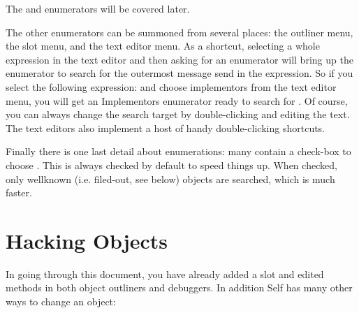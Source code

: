 \documentclass[letterpaper,10pt,english]{sphinxmanual}
\begin{document}
The  and  enumerators will be covered later.

The other enumerators can be summoned from several places: the outliner menu, the slot menu,
and the text editor menu. As a shortcut, selecting a whole expression in the text editor and then asking
for an enumerator will bring up the enumerator to search for the outermost message send in the
expression. So if you select the following expression:   
\sphinxcode{{[}snort{]}}  \sphinxcode{{[}sludge{]}} and choose implementors from the text editor menu, you will
get an Implementors enumerator ready to search for . Of
course, you can always change the search target by double-clicking and editing the text. The text
editors also implement a host of handy double-clicking shortcuts.

Finally there is one last detail about enumerations: many contain a check-box to choose . This is always checked by default to speed things up. When checked, only wellknown
(i.e. filed-out, see below) objects are searched, which is much faster.


\section{Hacking Objects}
\label{\detokenize{howtoprg:hacking-objects}}

In going through this document, you have already added a slot and edited methods in both object
outliners and debuggers. In addition Self has many other ways to change an object:
\end{document}
